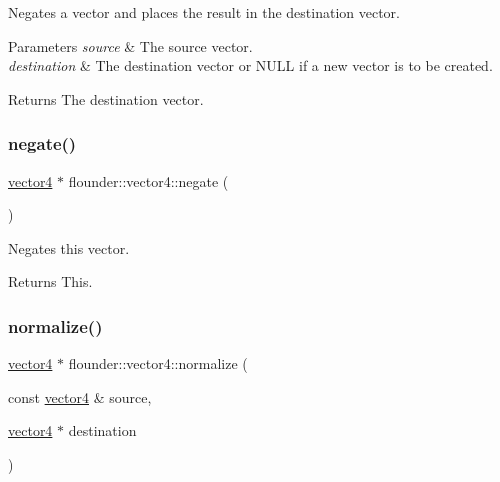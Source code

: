 Negates a vector and places the result in the destination vector. 


\begin{DoxyParams}{Parameters}
{\em source} & The source vector. \\
\hline
{\em destination} & The destination vector or N\+U\+LL if a new vector is to be created. \\
\hline
\end{DoxyParams}
\begin{DoxyReturn}{Returns}
The destination vector. 
\end{DoxyReturn}
\mbox{\label{classflounder_1_1vector4_a024aa43916f5c77623010019e31c5791}} 
\subsubsection{\texorpdfstring{negate()}{negate()}\hspace{0.1cm}{\footnotesize\ttfamily [2/2]}}
{\footnotesize\ttfamily \hyperlink{classflounder_1_1vector4}{vector4} $\ast$ flounder\+::vector4\+::negate (\begin{DoxyParamCaption}{ }\end{DoxyParamCaption})}



Negates this vector. 

\begin{DoxyReturn}{Returns}
This. 
\end{DoxyReturn}
\mbox{\label{classflounder_1_1vector4_a9e6b492a08b3e69b63badb88dada1129}} 
\subsubsection{\texorpdfstring{normalize()}{normalize()}\hspace{0.1cm}{\footnotesize\ttfamily [1/2]}}
{\footnotesize\ttfamily \hyperlink{classflounder_1_1vector4}{vector4} $\ast$ flounder\+::vector4\+::normalize (\begin{DoxyParamCaption}\item[{const \hyperlink{classflounder_1_1vector4}{vector4} \&}]{source,  }\item[{\hyperlink{classflounder_1_1vector4}{vector4} $\ast$}]{destination }\end{DoxyParamCaption})\hspace{0.3cm}{\ttfamily [static]}}



